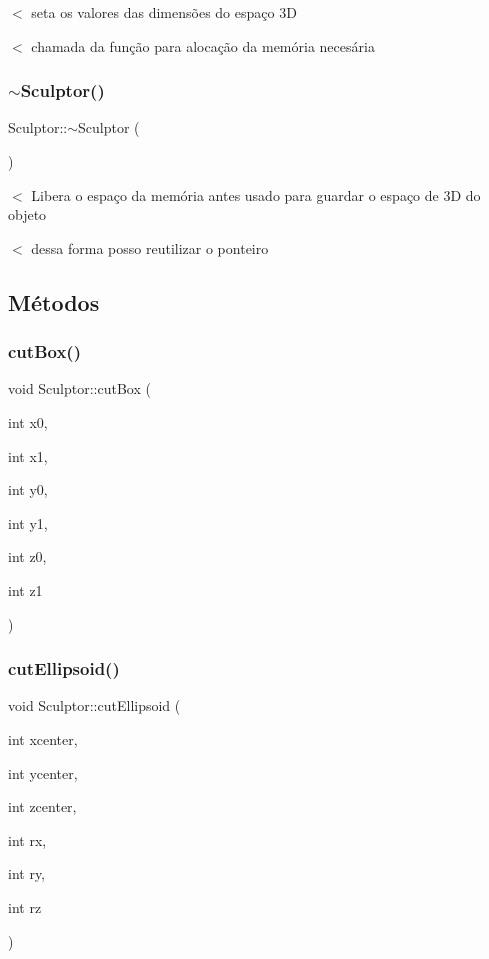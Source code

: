 $<$ seta os valores das dimensões do espaço 3D

$<$ chamada da função para alocação da memória necesária \mbox{\label{classSculptor_a8f159bf97458326f16d2e238e11be7ff}} 
\subsubsection{\texorpdfstring{$\sim$\+Sculptor()}{~Sculptor()}}
{\footnotesize\ttfamily Sculptor\+::$\sim$\+Sculptor (\begin{DoxyParamCaption}{ }\end{DoxyParamCaption})}

$<$ Libera o espaço da memória antes usado para guardar o espaço de 3D do objeto

$<$ dessa forma posso reutilizar o ponteiro 

\subsection{Métodos}
\mbox{\label{classSculptor_aa84a1b12b09e9e103fc8d78f8d1bc00f}} 
\subsubsection{\texorpdfstring{cut\+Box()}{cutBox()}}
{\footnotesize\ttfamily void Sculptor\+::cut\+Box (\begin{DoxyParamCaption}\item[{int}]{x0,  }\item[{int}]{x1,  }\item[{int}]{y0,  }\item[{int}]{y1,  }\item[{int}]{z0,  }\item[{int}]{z1 }\end{DoxyParamCaption})}

\mbox{\label{classSculptor_a18d2922c111c4c13653ee07d878151ad}} 
\subsubsection{\texorpdfstring{cut\+Ellipsoid()}{cutEllipsoid()}}
{\footnotesize\ttfamily void Sculptor\+::cut\+Ellipsoid (\begin{DoxyParamCaption}\item[{int}]{xcenter,  }\item[{int}]{ycenter,  }\item[{int}]{zcenter,  }\item[{int}]{rx,  }\item[{int}]{ry,  }\item[{int}]{rz }\end{DoxyParamCaption})}

